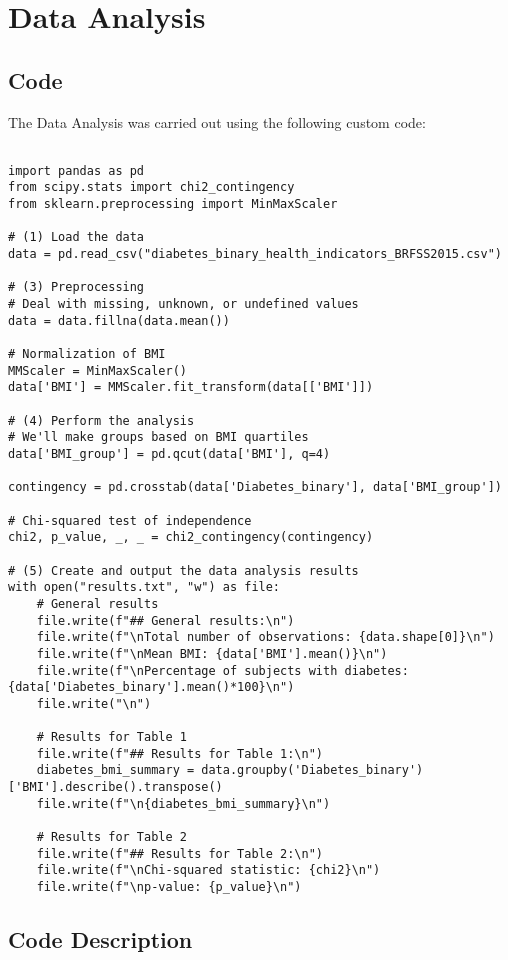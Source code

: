 \documentclass[11pt]{article}
\begin{document}
\section*{Data Analysis} \subsection*{Code}The Data Analysis was carried out using the following custom code:

\begin{verbatim}

import pandas as pd
from scipy.stats import chi2_contingency
from sklearn.preprocessing import MinMaxScaler

# (1) Load the data
data = pd.read_csv("diabetes_binary_health_indicators_BRFSS2015.csv")

# (3) Preprocessing
# Deal with missing, unknown, or undefined values
data = data.fillna(data.mean())

# Normalization of BMI
MMScaler = MinMaxScaler()
data['BMI'] = MMScaler.fit_transform(data[['BMI']])

# (4) Perform the analysis
# We'll make groups based on BMI quartiles
data['BMI_group'] = pd.qcut(data['BMI'], q=4)

contingency = pd.crosstab(data['Diabetes_binary'], data['BMI_group'])

# Chi-squared test of independence
chi2, p_value, _, _ = chi2_contingency(contingency)

# (5) Create and output the data analysis results
with open("results.txt", "w") as file:
    # General results
    file.write(f"## General results:\n")
    file.write(f"\nTotal number of observations: {data.shape[0]}\n")
    file.write(f"\nMean BMI: {data['BMI'].mean()}\n")
    file.write(f"\nPercentage of subjects with diabetes: {data['Diabetes_binary'].mean()*100}\n")
    file.write("\n")

    # Results for Table 1
    file.write(f"## Results for Table 1:\n")
    diabetes_bmi_summary = data.groupby('Diabetes_binary')['BMI'].describe().transpose()
    file.write(f"\n{diabetes_bmi_summary}\n")

    # Results for Table 2
    file.write(f"## Results for Table 2:\n")
    file.write(f"\nChi-squared statistic: {chi2}\n")
    file.write(f"\np-value: {p_value}\n")

\end{verbatim}

\subsection*{Code Description}
\end{document}
